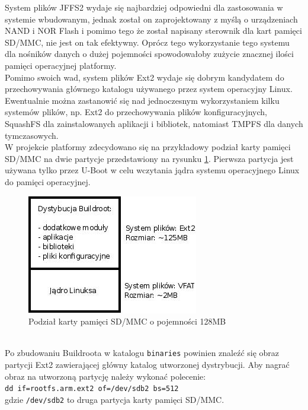 \documentclass[a4paper,12pt]{book}
\begin{document}
				System plików JFFS2 wydaje się najbardziej odpowiedni dla zastosowania w systemie wbudowanym, jednak został on zaprojektowany z myślą o urządzeniach NAND i NOR Flash i pomimo tego że został napisany sterownik dla kart pamięci SD/MMC, nie jest on tak efektywny. Oprócz tego wykorzystanie tego systemu dla nośników danych o dużej pojemności spowodowałoby zużycie znacznej ilości pamięci operacyjnej platformy.\\
				Pomimo swoich wad, system plików Ext2 wydaje się dobrym kandydatem do przechowywania głównego katalogu używanego przez system operacyjny Linux. Ewentualnie można zastanowić się nad jednoczesnym wykorzystaniem kilku systemów plików, np. Ext2 do przechowywania plików konfiguracyjnych, SquashFS dla zainstalowanych aplikacji i bibliotek, natomiast TMPFS dla danych tymczasowych.\\
				W projekcie platformy zdecydowano się na przykładowy podział karty pamięci SD/MMC na dwie partycje przedstawiony na rysunku \ref{fig:sd_mmc}. Pierwsza partycja jest używana tylko przez U-Boot w celu wczytania jądra systemu operacyjnego Linux do pamięci operacyjnej.\\
				\begin{figure}[h!]
					\begin{center}
						\includegraphics[scale=0.7]{img/sd_mmc.jpg}
						\caption{Podział karty pamięci SD/MMC o pojemności 128MB}
						\label{fig:sd_mmc}
					\end{center}
				\end{figure}\\			
				Po zbudowaniu Buildroota w katalogu \texttt{binaries} powinien znaleźć się obraz partycji Ext2 zawierającej główny katalog utworzonej dystrybucji. Aby nagrać obraz na utworzoną partycję należy wykonać polecenie:\\
				\texttt{dd if=rootfs.arm.ext2 of=/dev/sdb2 bs=512}\\
				gdzie \texttt{/dev/sdb2} to druga partycja karty pamięci SD/MMC.\\
\end{document}
